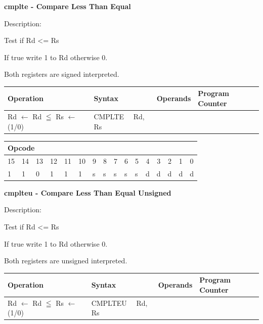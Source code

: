 \documentclass[%
	pdftex,
	a4paper,
	oneside,
	bibtotoc,%
	idxtotoc,%
	bibtotocnumbered,
	halfparskip,%
]{scrbook}
\begin{document}
\bigskip

\textbf{cmplte - Compare Less Than Equal}

Description:

Test if Rd <= Rs

If true write 1 to Rd otherwise 0.

Both registers are signed interpreted.

\begin{tabular}{|l|l|l|l|}
\hline
Operation & Syntax & Operands & Program Counter \\ \hline
Rd $\leftarrow $ Rd $\leqq $ Rs $\leftarrow $ (1/0) & CMPLTE \ \ Rd, Rs &  & 
\\ \hline
\end{tabular}

\begin{tabular}{|c|c|c|c|c|c|c|c|c|c|c|c|c|c|c|c|}
\hline
\multicolumn{6}{|l|}{Opcode} & \multicolumn{5}{|l|}{} & \multicolumn{5}{|l|}{
} \\ \hline
15 & 14 & 13 & 12 & 11 & 10 & 9 & 8 & 7 & 6 & 5 & 4 & 3 & 2 & 1 & 0 \\ \hline
\multicolumn{1}{|l|}{1} & \multicolumn{1}{|l|}{1} & \multicolumn{1}{|l|}{0}
& \multicolumn{1}{|l|}{1} & \multicolumn{1}{|l|}{1} & \multicolumn{1}{|l|}{1}
& \multicolumn{1}{|l|}{s} & \multicolumn{1}{|l|}{s} & \multicolumn{1}{|l|}{s}
& \multicolumn{1}{|l|}{s} & \multicolumn{1}{|l|}{s} & \multicolumn{1}{|l|}{d}
& \multicolumn{1}{|l|}{d} & \multicolumn{1}{|l|}{d} & \multicolumn{1}{|l|}{d}
& \multicolumn{1}{|l|}{d} \\ \hline
\end{tabular}

\bigskip

\textbf{cmplteu - Compare Less Than Equal Unsigned}

Description:

Test if Rd <= Rs

If true write 1 to Rd otherwise 0.

Both registers are unsigned interpreted.

\begin{tabular}{|l|l|l|l|}
\hline
Operation & Syntax & Operands & Program Counter \\ \hline
Rd $\leftarrow $ Rd $\leqq $ Rs $\leftarrow $ (1/0) & CMPLTEU \ \ Rd, Rs & 
&  \\ \hline
\end{tabular}
\end{document}
